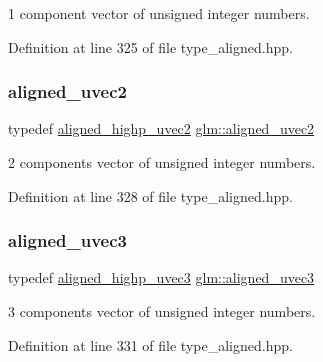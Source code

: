 1 component vector of unsigned integer numbers. 



Definition at line 325 of file type\+\_\+aligned.\+hpp.

\mbox{\label{group__gtc__type__aligned_gacddd39189c2dedf7dd48c02155279124}} 
\subsubsection{\texorpdfstring{aligned\_uvec2}{aligned\_uvec2}}
{\footnotesize\ttfamily typedef \mbox{\hyperlink{group__gtc__type__aligned_gadbe09d1af82957ec00a3baaa89120f1e}{aligned\+\_\+highp\+\_\+uvec2}} \mbox{\hyperlink{group__gtc__type__aligned_gacddd39189c2dedf7dd48c02155279124}{glm\+::aligned\+\_\+uvec2}}}



2 components vector of unsigned integer numbers. 



Definition at line 328 of file type\+\_\+aligned.\+hpp.

\mbox{\label{group__gtc__type__aligned_ga5dee635ca69be0f5de5630a59d89034f}} 
\subsubsection{\texorpdfstring{aligned\_uvec3}{aligned\_uvec3}}
{\footnotesize\ttfamily typedef \mbox{\hyperlink{group__gtc__type__aligned_gac7b68f6ca0c6a536c9692bfb885a0006}{aligned\+\_\+highp\+\_\+uvec3}} \mbox{\hyperlink{group__gtc__type__aligned_ga5dee635ca69be0f5de5630a59d89034f}{glm\+::aligned\+\_\+uvec3}}}



3 components vector of unsigned integer numbers. 



Definition at line 331 of file type\+\_\+aligned.\+hpp.

\mbox{\label{group__gtc__type__aligned_ga1e0792f3c64836e042ee3aad9bd8209c}} 
